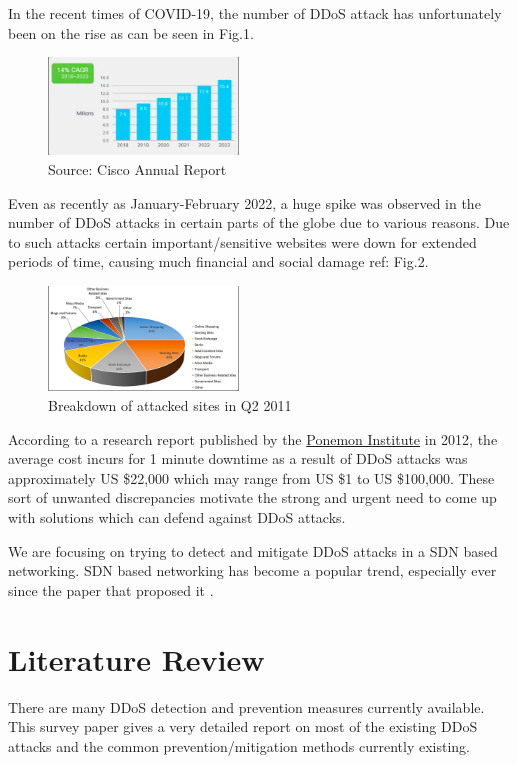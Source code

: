 \documentclass[10pt,twocolumn,letterpaper]{article}
\begin{document}
In the recent times of COVID-19, the number of DDoS attack has unfortunately been on the rise as can be seen in Fig.1. 
    \begin{figure}[h]
    \includegraphics[width = 0.45\textwidth]{src/img/ddos_cisco.png}
    \caption{Source: Cisco Annual Report}
    \label{fig:incep}
    \end{figure}
Even as recently as January-February 2022, a huge spike was observed in the number of DDoS attacks in certain parts of the globe due to various reasons. Due to such attacks certain important/sensitive websites were down for extended periods of time, causing much financial and social damage {ref: Fig.2}.
    \begin{figure}[h]
    \includegraphics[width = 0.45\textwidth]{src/img/ddos_pie.png}
    \caption{Breakdown of attacked sites in Q2 2011 \cite{ddos_survey}}
    \label{fig:incep}
    \end{figure}
According to a research report published by the \href{https://www.ponemon.org/}{Ponemon Institute} in 2012, the average cost incurs for 1 minute downtime as a result of DDoS attacks was approximately US \$22,000 which may range from US \$1 to US \$100,000. These sort of unwanted discrepancies motivate the strong and urgent need to come up with solutions which can defend against DDoS attacks.

We are focusing on trying to detect and mitigate DDoS attacks in a SDN based networking. SDN based networking has become a popular trend, especially ever since the paper that proposed it \cite{sdn}.
\section{Literature Review}

There are many DDoS detection and prevention measures currently available. This survey paper \cite{ddos_survey} gives a very detailed report on most of the existing DDoS attacks and the common prevention/mitigation methods currently existing.
\end{document}
